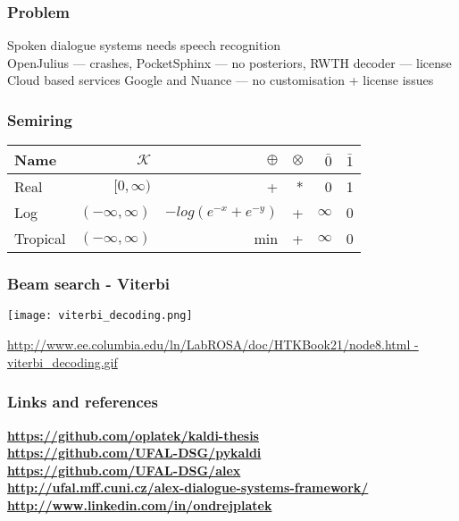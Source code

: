\begin{frame}\frametitle{Problem} 
    Spoken dialogue systems needs speech recognition \\
    OpenJulius --- crashes, PocketSphinx --- no posteriors, RWTH decoder --- license \\
    Cloud based services Google and Nuance --- no customisation + license issues
\end{frame}

\begin{frame} \frametitle{Semiring}
\begin{tabular}{lrrrrr}
\hline
Name & $\mathcal{K}$ & $\oplus$ & $ \otimes$ & $\bar{0}$ & $\bar{1}$ \\ 
\hline
Real        & $[0,\infty)$        &  +                     &  * &  0        &  1  \\
Log         & $(-\infty, \infty)$ & $-log(e^{-x} + e^{-y})$ & + &  $\infty$ &  0  \\
Tropical    & $(-\infty, \infty)$ &  min                   &  + &  $\infty$ &  0  \\
\hline
\end{tabular}
\end{frame}

\begin{frame}\frametitle{Beam search - Viterbi}
    \begin{center}
        \texttt{[image: viterbi\_decoding.png]}
    \end{center}
    \tiny{\url{http://www.ee.columbia.edu/ln/LabROSA/doc/HTKBook21/node8.html  - viterbi_decoding.gif}}
\end{frame}

\begin{frame}\frametitle{Links and references}
\begin{center}
    {\bf \url{https://github.com/oplatek/kaldi-thesis}}\\
    {\bf \url{https://github.com/UFAL-DSG/pykaldi}}\\
    {\bf \url{https://github.com/UFAL-DSG/alex}}\\
    {\bf \url{http://ufal.mff.cuni.cz/alex-dialogue-systems-framework/}}\\
    {\bf \url{http://www.linkedin.com/in/ondrejplatek}}\\
\end{center}
\end{frame}

